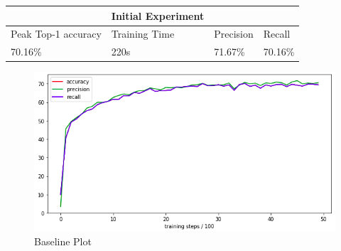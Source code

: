 \documentclass[12pt]{report}
\begin{document}
\vspace{0.5cm}
\begin{tabular}{llll}
                                          & Initial Experiment                 &                                &                              \\ \hline
\multicolumn{1}{|l|}{Peak Top-1 accuracy} & \multicolumn{1}{l|}{Training Time} & \multicolumn{1}{l|}{Precision} & \multicolumn{1}{l|}{Recall}  \\ \hline
\multicolumn{1}{|l|}{70.16\%}             & \multicolumn{1}{l|}{220s}          & \multicolumn{1}{l|}{71.67\%}   & \multicolumn{1}{l|}{70.16\%} \\ \hline
\end{tabular}

\vspace{0.5cm}
\begin{figure}[ht!]
	\centering
	\includegraphics[width=12cm]{baseline-graph}
	\caption{Baseline Plot}
	\label{fig:baseline}
\end{figure}
\end{document}
